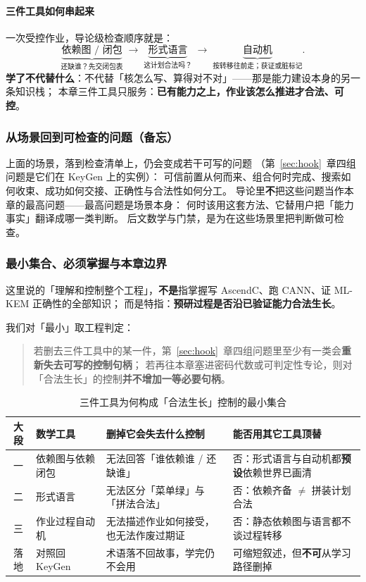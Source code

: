 \documentclass[UTF8,a4paper,11pt]{ctexart}
\theoremstyle{definition}
\theoremstyle{plain}
\theoremstyle{remark}
\numberwithin{figure}{section}
\numberwithin{table}{section}
\begin{document}
\paragraph{三件工具如何串起来}
一次受控作业，导论级检查顺序就是：
\[
\underbrace{\text{依赖图 / 闭包}}_{\text{还缺谁？先交闭包表}}
\;\longrightarrow\;
\underbrace{\text{形式语言}}_{\text{这计划合法吗？}}
\;\longrightarrow\;
\underbrace{\text{自动机}}_{\text{按转移往前走；获证或脏标记}}.
\]
\textbf{学了不代替什么}：不代替「核怎么写、算得对不对」——那是能力建设本身的另一条知识栈；
本章三件工具只服务：\textbf{已有能力之上，作业该怎么推进才合法、可控}。

\subsubsection{从场景回到可检查的问题（备忘）}

上面的场景，落到检查清单上，仍会变成若干可写的问题
（第~\ref{sec:hook}~章四组问题是它们在 KeyGen 上的实例）：
可信前置从何而来、组合何时完成、搜索如何收束、成功如何交接、正确性与合法性如何分工。
导论里\textbf{不}把这些问题当作本章的最高问题——最高问题是场景本身：
何时该用这套方法、它替用户把「能力事实」翻译成哪一类判断。
后文数学与门禁，是为在这些场景里把判断做可检查。

\subsubsection{最小集合、必须掌握与本章边界}

这里说的「理解和控制整个工程」，\textbf{不是}指掌握写 AscendC、跑 CANN、证 ML-KEM 正确性的全部知识；
而是特指：\textbf{预研过程是否沿已验证能力合法生长}。

我们对「最小」取工程判定：
\begin{quote}
\noindent
若删去三件工具中的某一件，第~\ref{sec:hook}~章四组问题里至少有一类会\textbf{重新失去可写的控制句柄}；
若再往本章塞进密码代数或可判定性专论，则对「合法生长」的控制\textbf{并不增加一等必要句柄}。
\end{quote}

\begin{table}[H]
\centering\small
\caption{三件工具为何构成「合法生长」控制的最小集合}
\label{tab:ch3-minimal}
\begin{tabular}{@{}c L{3.2cm} L{4.6cm} L{5.0cm}@{}}
  \toprule
  大段 & 数学工具 & 删掉它会失去什么控制 & 能否用其它工具顶替 \\
  \midrule
  一 & 依赖图与依赖闭包 &
  无法回答「谁依赖谁 / 还缺谁」 &
  否：形式语言与自动机都\textbf{预设}依赖世界已画清 \\
  \midrule
  二 & 形式语言 &
  无法区分「菜单绿」与「拼法合法」 &
  否：依赖齐备 $\neq$ 拼装计划合法 \\
  \midrule
  三 & 作业过程自动机 &
  无法描述作业如何接受，也无法作废过期证 &
  否：静态依赖图与语言都不谈过程转移 \\
  \midrule
  落地 & 对照回 KeyGen &
  术语落不回故事，学完仍不会用 &
  可缩短叙述，但\textbf{不可}从学习路径删掉 \\
  \bottomrule
\end{tabular}
\end{table}
\end{document}
